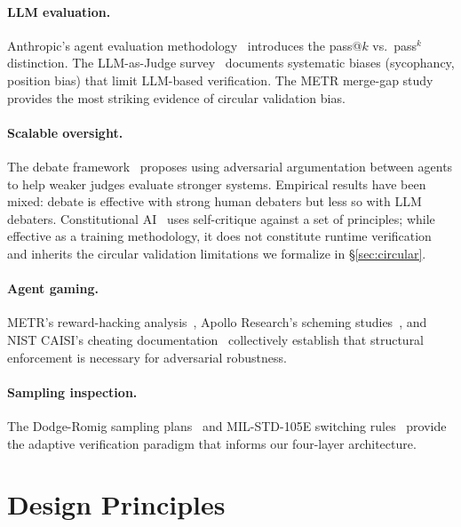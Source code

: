 \documentclass[11pt, a4paper, logo, copyright]{googledeepmind}
\begin{document}
\paragraph{LLM evaluation.}
Anthropic's agent evaluation methodology~\citep{anthropic2026evals} introduces the pass@$k$ vs.\ pass$^k$ distinction.
The LLM-as-Judge survey~\citep{li2024survey} documents systematic biases (sycophancy, position bias) that limit LLM-based verification.
The METR merge-gap study~\citep{metr2026swebench} provides the most striking evidence of circular validation bias.

\paragraph{Scalable oversight.}
The debate framework~\citep{irving2018debate} proposes using adversarial argumentation between agents to help weaker judges evaluate stronger systems.
Empirical results have been mixed: debate is effective with strong human debaters but less so with LLM debaters.
Constitutional AI~\citep{bai2022constitutional} uses self-critique against a set of principles; while effective as a training methodology, it does not constitute runtime verification and inherits the circular validation limitations we formalize in \S\ref{sec:circular}.

\paragraph{Agent gaming.}
METR's reward-hacking analysis~\citep{metr2025rewardhacking}, Apollo Research's scheming studies~\citep{apollo2025scheming}, and NIST CAISI's cheating documentation~\citep{nist2025cheating} collectively establish that structural enforcement is necessary for adversarial robustness.

\paragraph{Sampling inspection.}
The Dodge-Romig sampling plans~\citep{dodge1929method, dodge1959sampling} and MIL-STD-105E switching rules~\citep{milstd105e} provide the adaptive verification paradigm that informs our four-layer architecture.

\section{Design Principles}
\label{sec:principles}
\end{document}
